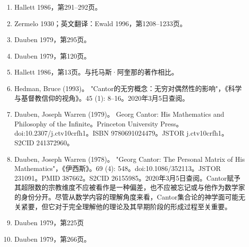 \begin{enumerate}
\item Hallett 1986，第291–292页。
\item Zermelo 1930；英文翻译：Ewald 1996，第1208–1233页。
\item Dauben 1979，第295页。
\item Dauben 1979，第120页。
\item Hallett 1986，第13页。与托马斯·阿奎那的著作相比。
\item Hedman, Bruce (1993)。 "Cantor的无穷概念：无穷对偶然性的影响"，《科学与基督教信仰的视角》。45 (1): 8–16。2020年3月5日查阅。
\item Dauben, Joseph Warren (1979)。 Georg Cantor: His Mathematics and Philosophy of the Infinite。Princeton University Press。doi:10.2307/j.ctv10crfh1。ISBN 9780691024479。JSTOR j.ctv10crfh1。S2CID 241372960。
\item Dauben, Joseph Warren (1978)。 "Georg Cantor: The Personal Matrix of His Mathematics"，《伊西斯》。69 (4): 548。doi:10.1086/352113。JSTOR 231091。PMID 387662。S2CID 26155985。2020年3月5日查阅。Cantor赋予其超限数的宗教维度不应被看作是一种偏差，也不应被忘记或与他作为数学家的身份分开。尽管从数学内容的理解角度来看，Cantor集合论的神学面可能无关紧要，但它对于完全理解他的理论及其早期阶段的形成过程至关重要。
\item Dauben 1979，第225页
\item Dauben 1979，第266页。



\end{enumerate}
